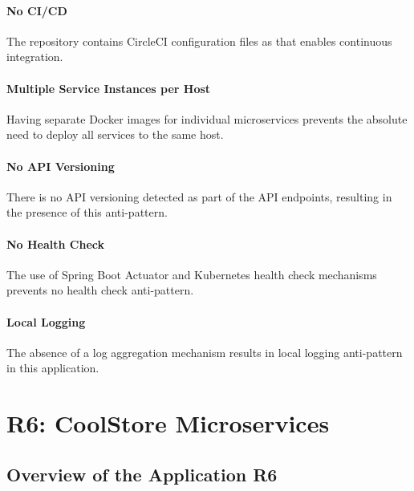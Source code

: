 \documentclass{Configuration_Files/PoliMi3i_thesis}
\begin{document}
\paragraph{No CI/CD} The repository contains CircleCI\footnotemark[94] configuration files as that enables continuous integration.

\paragraph{Multiple Service Instances per Host} Having separate Docker images for individual microservices prevents the absolute need to deploy all services to the same host.

\paragraph{No API Versioning} There is no API versioning detected as part of the API endpoints, resulting in the presence of this anti-pattern.

\paragraph{No Health Check} The use of Spring Boot Actuator and Kubernetes health check mechanisms prevents no health check anti-pattern.

\paragraph{Local Logging} The absence of a log aggregation mechanism results in local logging anti-pattern in this application.

\section{R6: CoolStore Microservices}
\label{sec:R6}

\subsection{Overview of the Application R6}
\label{subsec:R6_overview}
\end{document}
